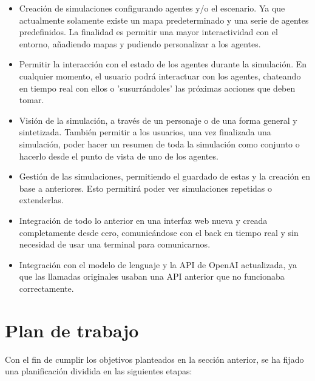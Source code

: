 \begin{itemize}
\item Creación de simulaciones configurando agentes y/o el escenario. Ya que actualmente solamente existe un mapa predeterminado y una serie de agentes predefinidos. La finalidad es permitir una mayor interactividad con el entorno, añadiendo mapas y pudiendo personalizar a los agentes.

\item Permitir la interacción con el estado de los agentes durante la simulación. En cualquier momento, el usuario podrá interactuar con los agentes, chateando en tiempo real con ellos o 'susurrándoles' las próximas acciones que deben tomar.

\item Visión de la simulación, a través de un personaje o de una forma general y sintetizada. También permitir a los usuarios, una vez finalizada una simulación, poder hacer un resumen de toda la simulación como conjunto o hacerlo desde el punto de vista de uno de los agentes.

\item Gestión de las simulaciones, permitiendo el guardado de estas y la creación en base a anteriores. Esto permitirá poder ver simulaciones repetidas o extenderlas.

\item Integración de todo lo anterior en una interfaz web nueva y creada completamente desde cero, comunicándose con el back en tiempo real y sin necesidad de usar una terminal para comunicarnos.

\item Integración con el modelo de lenguaje y la API de OpenAI actualizada, ya que las llamadas originales usaban una API anterior que no funcionaba correctamente.

\end{itemize}


\section{Plan de trabajo}
Con el fin de cumplir los objetivos planteados en la sección anterior, se ha fijado una planificación dividida en las siguientes etapas:

